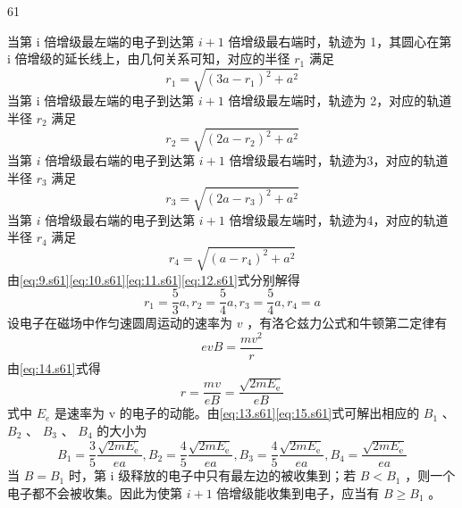 \begin{solution}{61}
\begin{subsolution}
        当第 i 倍增级最左端的电子到达第 $i+1$ 倍增级最右端时，轨迹为 1，其圆心在第 i 倍增级的延长线上，由几何关系可知，对应的半径 $r_{1}$ 满足
        \begin{equation}
            r _ {1} = \sqrt {\left(3 a - r _ {1}\right)^{2} + a^{2}}
            \label{eq:9.s61}
        \end{equation}
        当第 i 倍增级最左端的电子到达第 $i+1$ 倍增级最左端时，轨迹为 2，对应的轨道半径 $r_{2}$ 满足
        \begin{equation}
            r _ {2} = \sqrt {\left(2 a - r _ {2}\right)^{2} + a^{2}}
            \label{eq:10.s61}
        \end{equation}
        当第 $i$ 倍增级最右端的电子到达第 $i + 1$ 倍增级最右端时，轨迹为3，对应的轨道半径 $r_3$ 满足
        \begin{equation}
            r _ {3} = \sqrt {(2 a - r _ {3})^{2} + a^{2}}
            \label{eq:11.s61}
        \end{equation}
        当第 $i$ 倍增级最右端的电子到达第 $i + 1$ 倍增级最左端时，轨迹为4，对应的轨道半径 $r_4$ 满足
        \begin{equation}
            r _ {4} = \sqrt {(a - r _ {4})^{2} + a^{2}}
            \label{eq:12.s61}
        \end{equation}
        由\eqref{eq:9.s61}\eqref{eq:10.s61}\eqref{eq:11.s61}\eqref{eq:12.s61}式分别解得
        \begin{equation}
            r _ {1} = \frac {5}{3} a, r _ {2} = \frac {5}{4} a, r _ {3} = \frac {5}{4} a, r _ {4} = a
            \label{eq:13.s61}
        \end{equation}
        设电子在磁场中作匀速圆周运动的速率为 $v$ ，有洛仑兹力公式和牛顿第二定律有
        \begin{equation}
            e v B = \frac {m v^{2}}{r}
            \label{eq:14.s61}
        \end{equation}
        由\eqref{eq:14.s61}式得
        \begin{equation}
            r = \frac {m v}{e B} = \frac {\sqrt {2 m E _ {\mathrm{e}}}}{e B}
            \label{eq:15.s61}
        \end{equation}
        式中 $E_{e}$ 是速率为 v 的电子的动能。由\eqref{eq:13.s61}\eqref{eq:15.s61}式可解出相应的 $B_{1}$ 、 $B_{2}$ 、 $B_{3}$ 、 $B_{4}$ 的大小为
        \begin{equation}
            B _ {1} = \frac {3}{5} \frac {\sqrt {2 m E _ {\mathrm{e}}}}{e a}, B _ {2} = \frac {4}{5} \frac {\sqrt {2 m E _ {\mathrm{e}}}}{e a}, B _ {3} = \frac {4}{5} \frac {\sqrt {2 m E _ {\mathrm{e}}}}{e a}, B _ {4} = \frac {\sqrt {2 m E _ {\mathrm{e}}}}{e a}
            \label{eq:16.s61}
        \end{equation}
        当 $B = B_{1}$ 时，第 i 级释放的电子中只有最左边的被收集到；若 $B < B_{1}$ ，则一个电子都不会被收集。因此为使第 $i + 1$ 倍增级能收集到电子，应当有 $B \geq B_{1}$ 。


\end{subsolution}
\end{solution}
